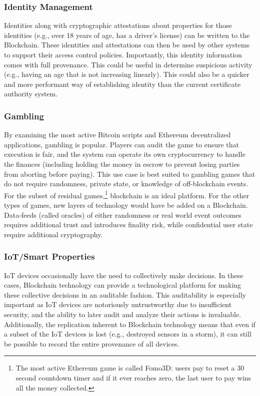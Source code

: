 \subsubsection{Identity Management}
Identities along with cryptographic attestations about properties for those identities (e.g., over 18 years of age, has a driver's license) can be written to the Blockchain.
These identities and attestations can then be used by other systems to support their access control policies.
Importantly, this identity information comes with full provenance. This could be useful in determine suspicious activity (e.g., having an age that is not increasing linearly).
This could also be a quicker and more performant way of establishing identity than the current certificate authority system.

\subsubsection{Gambling}
By examining the most active Bitcoin scripts and Ethereum decentralized applications, gambling is popular. Players can audit the game to ensure that execution is fair, and the system can operate its own cryptocurrency to handle the finances (including holding the money in escrow to prevent losing parties from aborting before paying). This use case is best suited to gambling games that do not require randomness, private state, or knowledge of off-blockchain events. For the subset of residual games,\footnote{The most active Ethereum game is called Fomo3D: users pay to reset a 30 second countdown timer and if it ever reaches zero, the last user to pay wins all the money collected.} blockchain is an ideal platform. For the other types of games, new layers of technology would have be added on a Blockchain. Data-feeds (called oracles) of either randomness or real world event outcomes requires additional trust and introduces finality risk, while confidential user state require additional cryptography.  


\subsubsection{IoT/Smart Properties}
IoT devices occasionally have the need to collectively make decisions.
In these cases, Blockchain technology can provide a technological platform for making these collective decisions in an auditable fashion.
This auditability is especially important as IoT devices are notoriously untrustworthy due to insufficient security, and the ability to later audit and analyze their actions is invaluable.
Additionally, the replication inherent to Blockchain technology means that even if a subset of the IoT devices is lost (e.g., destroyed sensors in a storm), it can still be possible to record the entire provenance of all devices.

